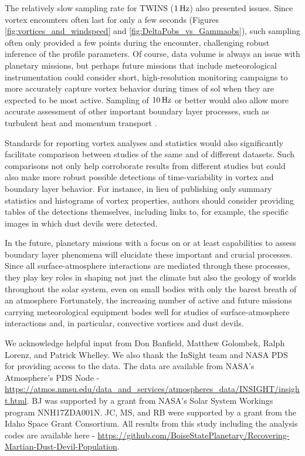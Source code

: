 \documentclass[linenumbers,trackchanges]{aastex63}
\begin{document}
The relatively slow sampling rate for TWINS ($1\,{\rm Hz}$) also presented issues. Since vortex encounters often last for only a few seconds (Figures \ref{fig:vortices_and_windspeed} and \ref{fig:DeltaPobs_vs_Gammaobs}), such sampling often only provided a few points during the encounter, challenging robust inference of the profile parameters. Of course, data volume is always an issue with planetary missions, but perhaps future missions that include meteorological instrumentation could consider short, high-resolution monitoring campaigns to more accurately capture vortex behavior during times of sol when they are expected to be most active. Sampling of $10\,{\rm Hz}$ or better would also allow more accurate assessment of other important boundary layer processes, such as turbulent heat and momentum transport \citep{2011RvGeo..49.3005P}.

Standards for reporting vortex analyses and statistics would also significantly facilitate comparison between studies of the same and of different datasets. Such comparisons not only help corroborate results from different studies but could also make more robust possible detections of time-variability in vortex and boundary layer behavior. For instance, in lieu of publishing only summary statistics and histograms of vortex properties, authors should consider providing tables of the detections themselves, including links to, for example, the specific images in which dust devils were detected.

In the future, planetary missions with a focus on or at least capabilities to assess boundary layer phenomena will elucidate these important and crucial processes. Since all surface-atmosphere interactions are mediated through these processes, they play key roles in shaping not just the climate but also the geology of worlds throughout the solar system, even on small bodies with only the barest breath of an atmosphere \citep{2017PNAS..114.2509J} Fortunately, the increasing number of active and future missions carrying meteorological equipment bodes well for studies of surface-atmosphere interactions and, in particular, convective vortices and dust devils. 

\acknowledgments

We acknowledge helpful input from Don Banfield, Matthew Golombek, Ralph Lorenz, and Patrick Whelley. We also thank the InSight team and NASA PDS for providing access to the data. The data are available from NASA's Atmosphere's PDS Node - \url{https://atmos.nmsu.edu/data_and_services/atmospheres_data/INSIGHT/insight.html}. BJ was supported by a grant from NASA's Solar System Workings program NNH17ZDA001N. JC, MS, and RB were supported by a grant from the Idaho Space Grant Consortium. All results from this study including the analysis codes are available here - \url{https://github.com/BoiseStatePlanetary/Recovering-Martian-Dust-Devil-Population}.
\end{document}

